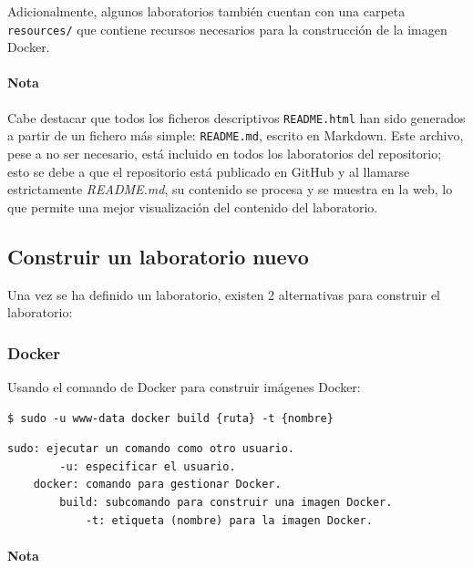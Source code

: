             Adicionalmente, algunos laboratorios también cuentan con una carpeta \texttt{resources/} que contiene recursos necesarios para la construcción de la imagen Docker.

            \paragraph{Nota}
                
                Cabe destacar que todos los ficheros descriptivos \texttt{README.html} han sido generados a partir de un fichero más simple: \texttt{README.md}, escrito en Markdown. Este archivo, pese a no ser necesario, está incluido en todos los laboratorios del repositorio; esto se debe a que el repositorio está publicado en GitHub y al llamarse estrictamente \textit{README.md}, su contenido se procesa y se muestra en la web, lo que permite una mejor visualización del contenido del laboratorio.

        \subsection{Construir un laboratorio nuevo}
            \label{sec:construir-laboratorio}

            Una vez se ha definido un laboratorio, existen 2 alternativas para construir el laboratorio:

            \subsubsection{Docker}

                Usando el comando de Docker para construir imágenes Docker:
                \\

                \begin{lstlisting}[style=bash_style]
    $ sudo -u www-data docker build {ruta} -t {nombre}
                \end{lstlisting}

                \begin{lstlisting}[style=comment_style]
    sudo: ejecutar un comando como otro usuario.
        -u: especificar el usuario.
    docker: comando para gestionar Docker.
        build: subcomando para construir una imagen Docker.
            -t: etiqueta (nombre) para la imagen Docker.
                \end{lstlisting}

                \paragraph{Nota}

